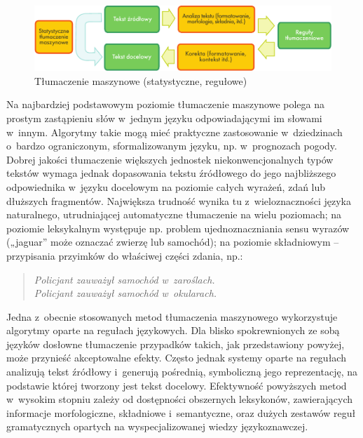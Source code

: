 \begin{multicols}{2}
\begin{figure}[htb]  \center
\includegraphics[width=\textwidth]{../_media/polish/machine_translation}
\caption{Tłumaczenie maszynowe (statystyczne, regułowe)} \label{fig:
mtarch_pl}  \end{figure} 


Na najbardziej podstawowym poziomie tłumaczenie maszynowe polega na
prostym zastąpieniu słów w~jednym języku odpowiadającymi im
słowami w~innym. Algorytmy takie mogą mieć praktyczne zastosowanie
w~dziedzinach o~bardzo ograniczonym, sformalizowanym języku, np.
w~prognozach pogody. Dobrej jakości tłumaczenie większych jednostek
niekonwencjonalnych typów tekstów wymaga jednak dopasowania tekstu
źródłowego do jego najbliższego odpowiednika w~języku docelowym
na poziomie całych wyrażeń, zdań lub dłuższych fragmentów.
Największa trudność wynika tu z~wieloznaczności języka
naturalnego, utrudniającej automatyczne tłumaczenie na wielu
poziomach; na poziomie leksykalnym występuje np. problem
ujednoznaczniania sensu wyrazów („jaguar” może oznaczać
zwierzę lub samochód); na poziomie składniowym – przypisania
przyimków do właściwej części zdania, np.: 

\begin{verse} \textit{Policjant zauważył samochód w~zaroślach.}\\
\textit{Policjant zauważył samochód w~okularach.} \end{verse} 

Jedna z~obecnie stosowanych metod tłumaczenia maszynowego
wykorzystuje algorytmy oparte na regułach językowych. Dla blisko
spokrewnionych ze sobą języków dosłowne tłumaczenie przypadków
takich, jak przedstawiony powyżej, może przynieść akceptowalne
efekty. Często jednak systemy oparte na regułach analizują tekst
źródłowy i~generują pośrednią, symboliczną jego reprezentację,
na podstawie której tworzony jest tekst docelowy. Efektywność
powyższych metod w~wysokim stopniu zależy od dostępności
obszernych leksykonów, zawierających informacje morfologiczne,
składniowe i~semantyczne, oraz dużych zestawów reguł gramatycznych
opartych na wyspecjalizowanej wiedzy językoznawczej. 


\end{multicols}
